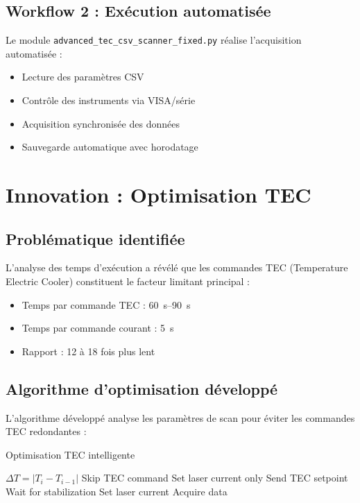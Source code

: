 \subsection{Workflow 2 : Exécution automatisée}

Le module \texttt{advanced\_tec\_csv\_scanner\_fixed.py} réalise l'acquisition automatisée :
\begin{itemize}
    \item Lecture des paramètres CSV
    \item Contrôle des instruments via VISA/série
    \item Acquisition synchronisée des données
    \item Sauvegarde automatique avec horodatage
\end{itemize}

\section{Innovation : Optimisation TEC}

\subsection{Problématique identifiée}

L'analyse des temps d'exécution a révélé que les commandes TEC (Temperature Electric Cooler) constituent le facteur limitant principal :
\begin{itemize}
    \item Temps par commande TEC : \SIrange{60}{90}{\second}
    \item Temps par commande courant : \SI{5}{\second}
    \item Rapport : 12 à 18 fois plus lent
\end{itemize}

\subsection{Algorithme d'optimisation développé}

L'algorithme développé analyse les paramètres de scan pour éviter les commandes TEC redondantes :

\begin{algorithm}[ht]
\caption{Optimisation TEC intelligente}
\begin{algorithmic}[1]
    \State $\Delta T = |T_i - T_{i-1}|$
        \State Skip TEC command
        \State Set laser current only
    \Else
        \State Send TEC setpoint
        \State Wait for stabilization
        \State Set laser current
    \EndIf
    \State Acquire data
\EndFor
\end{algorithmic}
\end{algorithm}


